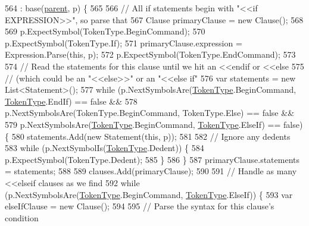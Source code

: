\begin{DoxyCode}
564                                                              : base(\hyperlink{a00138_af313a82103fcc2ff5a177dbb06b92f7b}{parent}, p) \{
565 
566                 \textcolor{comment}{// All if statements begin with "<<if EXPRESSION>>", so parse that}
567                 Clause primaryClause = \textcolor{keyword}{new} Clause();
568 
569                 p.ExpectSymbol(TokenType.BeginCommand);
570                 p.ExpectSymbol(TokenType.If);
571                 primaryClause.expression = Expression.Parse(\textcolor{keyword}{this}, p);
572                 p.ExpectSymbol(TokenType.EndCommand);
573 
574                 \textcolor{comment}{// Read the statements for this clause until  we hit an <<endif or <<else}
575                 \textcolor{comment}{// (which could be an "<<else>>" or an "<<else if"}
576                 var statements = \textcolor{keyword}{new} List<Statement>();
577                 \textcolor{keywordflow}{while} (p.NextSymbolsAre(\hyperlink{a00041_a301aa7c866593a5b625a8fc158bbeace}{TokenType}.BeginCommand, 
      \hyperlink{a00041_a301aa7c866593a5b625a8fc158bbeace}{TokenType}.EndIf) == \textcolor{keyword}{false} &&
578                     p.NextSymbolsAre(TokenType.BeginCommand, TokenType.Else) == \textcolor{keyword}{false} &&
579                     p.NextSymbolsAre(\hyperlink{a00041_a301aa7c866593a5b625a8fc158bbeace}{TokenType}.BeginCommand, \hyperlink{a00041_a301aa7c866593a5b625a8fc158bbeace}{TokenType}.ElseIf) == \textcolor{keyword}{false}) 
      \{
580                     statements.Add(\textcolor{keyword}{new} Statement(\textcolor{keyword}{this}, p));
581 
582                     \textcolor{comment}{// Ignore any dedents}
583                     \textcolor{keywordflow}{while} (p.NextSymbolIs(\hyperlink{a00041_a301aa7c866593a5b625a8fc158bbeace}{TokenType}.Dedent)) \{
584                         p.ExpectSymbol(TokenType.Dedent);
585                     \}
586                 \}
587                 primaryClause.statements = statements;
588 
589                 clauses.Add(primaryClause);
590 
591                 \textcolor{comment}{// Handle as many <<elseif clauses as we find}
592                 \textcolor{keywordflow}{while} (p.NextSymbolsAre(\hyperlink{a00041_a301aa7c866593a5b625a8fc158bbeace}{TokenType}.BeginCommand, 
      \hyperlink{a00041_a301aa7c866593a5b625a8fc158bbeace}{TokenType}.ElseIf)) \{
593                     var elseIfClause = \textcolor{keyword}{new} Clause();
594 
595                     \textcolor{comment}{// Parse the syntax for this clause's condition}

\end{DoxyCode}
